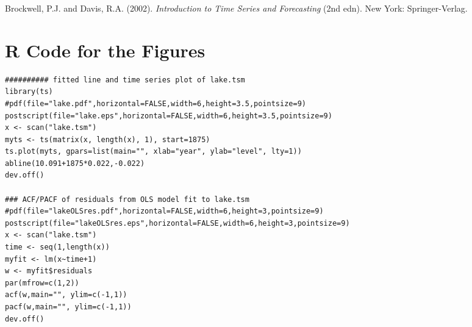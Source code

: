 \documentclass[11pt]{article}
\begin{document}
\begin{thebibliography}{99}

Brockwell, P.J. and Davis, R.A. (2002).
\textit{Introduction to Time Series and Forecasting} (2nd edn). New York: Springer-Verlag.

\end{thebibliography}

\appendix
\section{R Code for the Figures}
\begin{verbatim}
########## fitted line and time series plot of lake.tsm
library(ts)
#pdf(file="lake.pdf",horizontal=FALSE,width=6,height=3.5,pointsize=9)
postscript(file="lake.eps",horizontal=FALSE,width=6,height=3.5,pointsize=9)
x <- scan("lake.tsm")
myts <- ts(matrix(x, length(x), 1), start=1875)
ts.plot(myts, gpars=list(main="", xlab="year", ylab="level", lty=1))
abline(10.091+1875*0.022,-0.022)
dev.off()

### ACF/PACF of residuals from OLS model fit to lake.tsm 
#pdf(file="lakeOLSres.pdf",horizontal=FALSE,width=6,height=3,pointsize=9)
postscript(file="lakeOLSres.eps",horizontal=FALSE,width=6,height=3,pointsize=9)
x <- scan("lake.tsm")
time <- seq(1,length(x))
myfit <- lm(x~time+1)
w <- myfit$residuals
par(mfrow=c(1,2))
acf(w,main="", ylim=c(-1,1))
pacf(w,main="", ylim=c(-1,1))
dev.off()
\end{verbatim}
\end{document}
